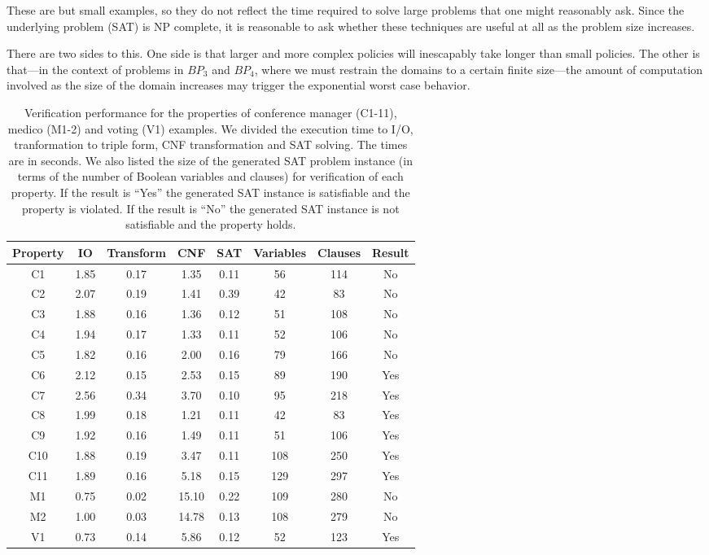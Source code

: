 These are but small examples, so they do not reflect the time required
to solve large problems that one might reasonably ask.  Since the
underlying problem (SAT) is NP complete, it is reasonable to ask
whether these techniques are useful at all as the problem size
increases.

There are two sides to this.  One side is that larger and more complex
policies will inescapably take longer than small policies.  The other
is that---in the context of problems in $BP_3$ and $BP_4$, where we
must restrain the domains to a certain finite size---the amount of
computation involved as the size of the domain increases may trigger
the exponential worst case behavior.

\begin{table*}[t]
\centering
\begin{tabular}{c|cccc|cc|c}
  Property & IO & Transform & CNF & SAT & Variables
  & Clauses & Result \\
  \hline
  C1 & 1.85 & 0.17 & 1.35 & 0.11 & 56 & 114 & No \\
  C2 & 2.07 & 0.19 & 1.41 & 0.39 & 42 & 83  & No \\
  C3 & 1.88 & 0.16 & 1.36 & 0.12 & 51 & 108 & No \\
  C4 & 1.94 & 0.17 & 1.33 & 0.11 & 52 & 106 & No \\
  C5 & 1.82 & 0.16 & 2.00 & 0.16 &  79 & 166 & No \\
  \hline
  C6 & 2.12 & 0.15 & 2.53 & 0.15 & 89 & 190 & Yes \\
  C7 & 2.56 & 0.34 & 3.70 & 0.10 & 95 & 218 & Yes  \\
  C8 & 1.99 & 0.18 & 1.21 & 0.11 & 42 & 83 & Yes \\
  C9 & 1.92 & 0.16 & 1.49 & 0.11 & 51 & 106 & Yes \\
  C10 & 1.88 & 0.19 & 3.47 & 0.11 & 108 & 250 & Yes \\
  C11 & 1.89 & 0.16 & 5.18 & 0.15 & 129 & 297& Yes \\
  \hline
  M1 & 0.75 & 0.02 & 15.10 & 0.22 & 109 & 280 & No \\
  M2 & 1.00 & 0.03 & 14.78 & 0.13 & 108 & 279 & No \\
\hline
  V1 & 0.73 & 0.14 & 5.86 & 0.12 & 52 & 123 & Yes \\
\end{tabular}
\caption{Verification performance for the 
properties of conference manager (C1-11), medico (M1-2) and
voting (V1) examples. 
We divided the execution time to I/O, tranformation
to triple form, CNF transformation and SAT solving.
The times are in seconds.
We also listed the size of the generated SAT problem instance 
(in terms of the number of Boolean variables and clauses)
for verification of each property.
If the result is ``Yes'' the generated SAT instance is satisfiable
and the property is violated. 
If the result is ``No'' the generated SAT instance is not satisfiable
and the property holds.
}
\label{tbl:bigdata}
\end{table*}




